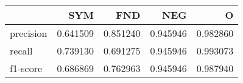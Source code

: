 \begin{tabular}{lrrrr}
\toprule
{} &       SYM &       FND &       NEG &         O \\
\midrule
precision &  0.641509 &  0.851240 &  0.945946 &  0.982860 \\
recall    &  0.739130 &  0.691275 &  0.945946 &  0.993073 \\
f1-score  &  0.686869 &  0.762963 &  0.945946 &  0.987940 \\
\bottomrule
\end{tabular}